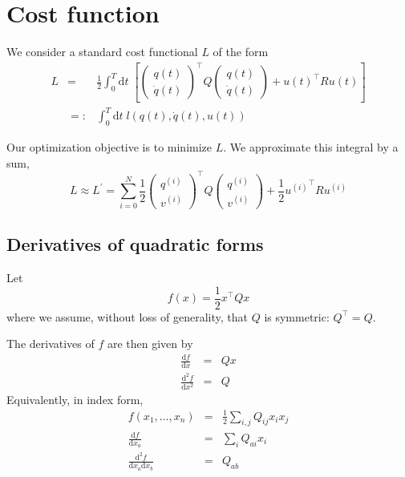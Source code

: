 \documentclass[a4paper]{article}
\begin{document}
\section{Cost function}
We consider a standard cost functional $L$ of the form
\begin{eqnarray}
L &=& \frac{1}{2} \int_0^T\mathrm{d}t\;\left[
\left(\begin{array}{cc}q(t)\\ \dot{q}(t)\end{array}\right)^\top
Q
\left(\begin{array}{cc}q(t)\\ \dot{q}(t)\end{array}\right)
+ u(t)^\top R u(t)
\right]\\
\nonumber &=:& \int_0^T\mathrm{d}t\; l(q(t), \dot{q}(t), u(t))
\end{eqnarray}

Our optimization objective is to minimize $L$. We approximate this integral by a sum,
\begin{equation}
L \approx L^\prime = \sum_{i=0}^{N} \frac{1}{2} \left(\begin{array}{cc}q^{(i)}\\v^{(i)}\end{array}\right)^\top Q \left(\begin{array}{cc}q^{(i)}\\v^{(i)}\end{array}\right) + \frac{1}{2} {u^{(i)}}^\top R u^{(i)}
\end{equation}

\subsection{Derivatives of quadratic forms}
Let
\begin{equation}
f(x) = \frac{1}{2} x^\top Q x
\end{equation}
where we assume, without loss of generality, that $Q$ is symmetric: $Q^\top = Q$.

The derivatives of $f$ are then given by
\begin{eqnarray}
\frac{\mathrm{d}f}{\mathrm{d}x} &=& Q x\\
\frac{\mathrm{d}^2 f}{\mathrm{d}x^2} &=& Q
\end{eqnarray}
Equivalently, in index form,
\begin{eqnarray}
f(x_1,\ldots,x_n) &=& \frac{1}{2} \sum_{i,j} Q_{ij} x_i x_j\\
\frac{\mathrm{d}f}{\mathrm{d}x_a} &=& \sum_{i} Q_{ai} x_i\\
\frac{\mathrm{d}^2 f}{\mathrm{d}x_a \mathrm{d}x_b} &=& Q_{ab}
\end{eqnarray}
\end{document}

